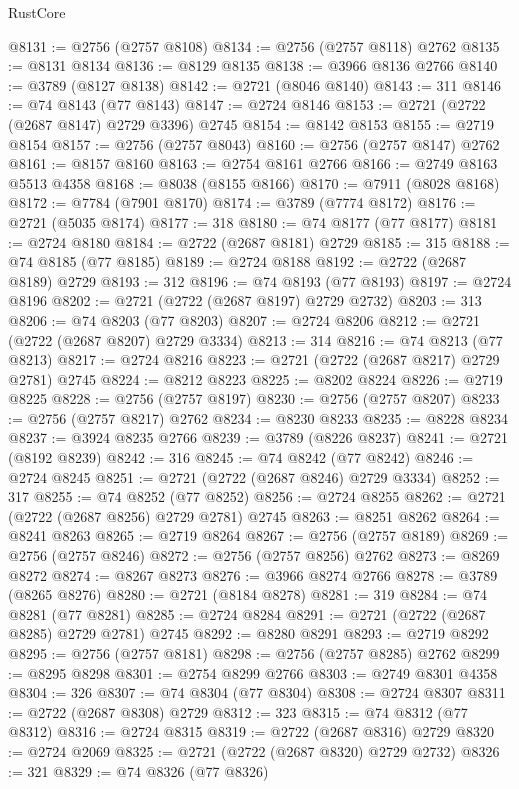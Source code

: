 \begin{lexlean}{RustCore}
\begin{coremodule}
@8131 := @2756 (@2757 @8108)
@8134 := @2756 (@2757 @8118) @2762
@8135 := @8131 @8134
@8136 := @8129 @8135
@8138 := @3966 @8136 @2766
@8140 := @3789 (@8127 @8138)
@8142 := @2721 (@8046 @8140)
@8143 := 311
@8146 := @74 @8143 (@77 @8143)
@8147 := @2724 @8146
@8153 := @2721 (@2722 (@2687 @8147) @2729 @3396) @2745
@8154 := @8142 @8153
@8155 := @2719 @8154
@8157 := @2756 (@2757 @8043)
@8160 := @2756 (@2757 @8147) @2762
@8161 := @8157 @8160
@8163 := @2754 @8161 @2766
@8166 := @2749 @8163 @5513 @4358
@8168 := @8038 (@8155 @8166)
@8170 := @7911 (@8028 @8168)
@8172 := @7784 (@7901 @8170)
@8174 := @3789 (@7774 @8172)
@8176 := @2721 (@5035 @8174)
@8177 := 318
@8180 := @74 @8177 (@77 @8177)
@8181 := @2724 @8180
@8184 := @2722 (@2687 @8181) @2729
@8185 := 315
@8188 := @74 @8185 (@77 @8185)
@8189 := @2724 @8188
@8192 := @2722 (@2687 @8189) @2729
@8193 := 312
@8196 := @74 @8193 (@77 @8193)
@8197 := @2724 @8196
@8202 := @2721 (@2722 (@2687 @8197) @2729 @2732)
@8203 := 313
@8206 := @74 @8203 (@77 @8203)
@8207 := @2724 @8206
@8212 := @2721 (@2722 (@2687 @8207) @2729 @3334)
@8213 := 314
@8216 := @74 @8213 (@77 @8213)
@8217 := @2724 @8216
@8223 := @2721 (@2722 (@2687 @8217) @2729 @2781) @2745
@8224 := @8212 @8223
@8225 := @8202 @8224
@8226 := @2719 @8225
@8228 := @2756 (@2757 @8197)
@8230 := @2756 (@2757 @8207)
@8233 := @2756 (@2757 @8217) @2762
@8234 := @8230 @8233
@8235 := @8228 @8234
@8237 := @3924 @8235 @2766
@8239 := @3789 (@8226 @8237)
@8241 := @2721 (@8192 @8239)
@8242 := 316
@8245 := @74 @8242 (@77 @8242)
@8246 := @2724 @8245
@8251 := @2721 (@2722 (@2687 @8246) @2729 @3334)
@8252 := 317
@8255 := @74 @8252 (@77 @8252)
@8256 := @2724 @8255
@8262 := @2721 (@2722 (@2687 @8256) @2729 @2781) @2745
@8263 := @8251 @8262
@8264 := @8241 @8263
@8265 := @2719 @8264
@8267 := @2756 (@2757 @8189)
@8269 := @2756 (@2757 @8246)
@8272 := @2756 (@2757 @8256) @2762
@8273 := @8269 @8272
@8274 := @8267 @8273
@8276 := @3966 @8274 @2766
@8278 := @3789 (@8265 @8276)
@8280 := @2721 (@8184 @8278)
@8281 := 319
@8284 := @74 @8281 (@77 @8281)
@8285 := @2724 @8284
@8291 := @2721 (@2722 (@2687 @8285) @2729 @2781) @2745
@8292 := @8280 @8291
@8293 := @2719 @8292
@8295 := @2756 (@2757 @8181)
@8298 := @2756 (@2757 @8285) @2762
@8299 := @8295 @8298
@8301 := @2754 @8299 @2766
@8303 := @2749 @8301 @4358
@8304 := 326
@8307 := @74 @8304 (@77 @8304)
@8308 := @2724 @8307
@8311 := @2722 (@2687 @8308) @2729
@8312 := 323
@8315 := @74 @8312 (@77 @8312)
@8316 := @2724 @8315
@8319 := @2722 (@2687 @8316) @2729
@8320 := @2724 @2069
@8325 := @2721 (@2722 (@2687 @8320) @2729 @2732)
@8326 := 321
@8329 := @74 @8326 (@77 @8326)

\end{coremodule}
\end{lexlean}
